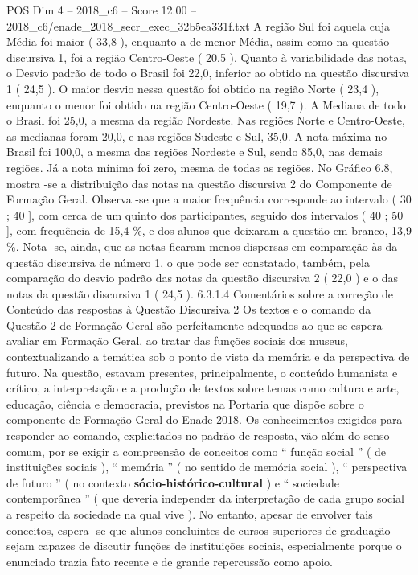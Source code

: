 \begin{textsample}{POS Dim 4 – 2018\_c6 – Score 12.00 – 2018\_c6/enade\_2018\_secr\_exec\_32b5ea331f.txt}
A região Sul foi aquela cuja Média foi maior ( 33,8 ), enquanto a de menor Média, assim como na questão discursiva 1, foi a região Centro-Oeste ( 20,5 ).
Quanto à variabilidade das notas, o Desvio padrão de todo o Brasil foi 22,0, inferior ao obtido na questão discursiva 1 ( 24,5 ).
O maior desvio nessa questão foi obtido na região Norte ( 23,4 ), enquanto o menor foi obtido na região Centro-Oeste ( 19,7 ).
A Mediana de todo o Brasil foi 25,0, a mesma da região Nordeste.
Nas regiões Norte e Centro-Oeste, as medianas foram 20,0, e nas regiões Sudeste e Sul, 35,0.
A nota máxima no Brasil foi 100,0, a mesma das regiões Nordeste e Sul, sendo 85,0, nas demais regiões.
Já a nota mínima foi zero, mesma de todas as regiões.
No Gráfico 6.8, mostra -se a distribuição das notas na questão discursiva 2 do Componente de Formação Geral.
Observa -se que a maior frequência corresponde ao intervalo ( 30 ; 40 ], com cerca de um quinto dos participantes, seguido dos intervalos ( 40 ; 50 ], com frequência de 15,4 \%, e dos alunos que deixaram a questão em branco, 13,9 \%.
Nota -se, ainda, que as notas ficaram menos dispersas em comparação às da questão discursiva de número 1, o que pode ser constatado, também, pela comparação do desvio padrão das notas da questão discursiva 2 ( 22,0 ) e o das notas da questão discursiva 1 ( 24,5 ). 6.3.1.4 Comentários sobre a correção de Conteúdo das respostas à Questão Discursiva 2 Os textos e o comando da Questão 2 de Formação Geral são perfeitamente adequados ao que se espera avaliar em Formação Geral, ao tratar das funções sociais dos museus, contextualizando a temática sob o ponto de vista da memória e da perspectiva de futuro.
Na questão, estavam presentes, principalmente, o conteúdo humanista e crítico, a interpretação e a produção de textos sobre temas como cultura e arte, educação, ciência e democracia, previstos na Portaria que dispõe sobre o componente de Formação Geral do Enade 2018.
Os conhecimentos exigidos para responder ao comando, explicitados no padrão de resposta, vão além do senso comum, por se exigir a compreensão de conceitos como “ função social ” ( de instituições sociais ), “ memória ” ( no sentido de memória social ), “ perspectiva de futuro ” ( no contexto \textbf{sócio-histórico-cultural} ) e “ sociedade contemporânea ” ( que deveria independer da interpretação de cada grupo social a respeito da sociedade na qual vive ).
No entanto, apesar de envolver tais conceitos, espera -se que alunos concluintes de cursos superiores de graduação sejam capazes de discutir funções de instituições sociais, especialmente porque o enunciado trazia fato recente e de grande repercussão como apoio.

\end{textsample}
